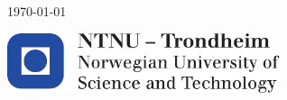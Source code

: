 \documentclass[pdftex,10pt,b5paper,twoside]{book}
\begin{document}
\begin{titlepage}
	
	
	\vfill\vfill\vfill %
	
	{\large\today} %
	
	
	\vfill\vfill
	\includegraphics[width=0.6\textwidth]{0_Images/logontnu.pdf}\\[1cm] %
	 
	
	\vfill %
	
\end{titlepage}
\let\cleardoublepage\clearpage


\tableofcontents
\listoffigures
\thispagestyle{empty} %
\newpage    

\setcounter{page}{1}









\newpage

\end{document}

